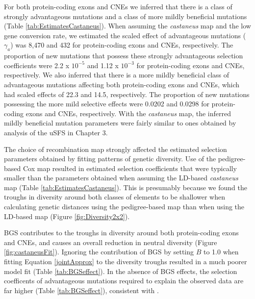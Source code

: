 {\linespread{1}

\linespread{2}

	For both protein-coding exons and CNEs we inferred that there is a class of strongly advantageous mutations and a class of more mildly beneficial mutations (Table \ref{tab:EstimatesCastaneus}). When assuming the \textit{castaneus} map and the low gene conversion rate, we estimated the scaled effect of advantageous mutations ($\gamma_a$) was 8,470 and 432 for protein-coding exons and CNEs, respectively. The proportion of new mutations that possess these strongly advantageous selection coefficients were 2.2 x $10^{-5}$ and 1.12 x $10^{-3}$ for protein-coding exons and CNEs, respectively. We also inferred that there is a more mildly beneficial class of advantageous mutations affecting both protein-coding exons and CNEs, which had scaled effects of 22.3 and 14.5, respectively. The proportion of new mutations possessing the more mild selective effects were 0.0202 and 0.0298 for protein-coding exons and CNEs, respectively. With the \textit{castaneus} map, the inferred mildly beneficial mutation parameters were fairly similar to ones obtained by analysis of the uSFS in Chapter 3.

\linespread{1}

\linespread{2}	
	
	The choice of recombination map strongly affected the estimated selection parameters obtained by fitting patterns of genetic diversity. Use of the pedigree-based Cox map resulted in estimated selection coefficients that were typically smaller than the parameters obtained when assuming the LD-based \textit{castaneus} map (Table \ref{tab:EstimatesCastaneus}). This is presumably because we found the troughs in diversity around both classes of elements to be shallower when calculating genetic distances using the pedigree-based map than when using the LD-based map (Figure \ref{fig:Diversity2x2}).
	
	BGS contributes to the troughs in diversity around both protein-coding exons and CNEs, and causes an overall reduction in neutral diversity (Figure \ref{fig:castaneusFit}). Ignoring the contribution of BGS by setting $B$ to 1.0 when fitting Equation \ref{jointApprox} to the diversity troughs resulted in a much poorer model fit (Table \ref{tab:BGSeffect}). In the absence of BGS effects, the selection coefficents of advantageous mutations required to explain the observed data are far higher (Table \ref{tab:BGSeffect}), consistent with \cite{RN290}. 
	
}
